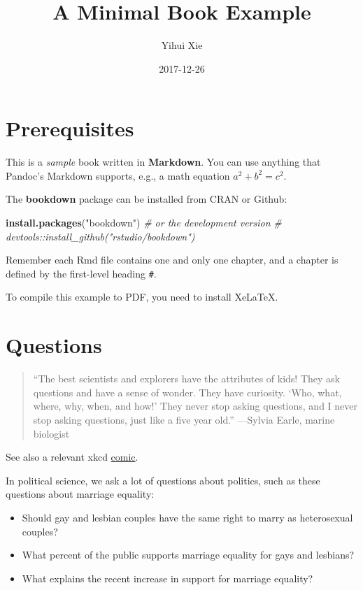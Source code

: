 \documentclass[]{book}
\title{A Minimal Book Example}
\author{Yihui Xie}
\date{2017-12-26}
\newenvironment{Shaded}{\begin{snugshade}}{\end{snugshade}}
\newcommand{\KeywordTok}[1]{\textcolor[rgb]{0.13,0.29,0.53}{\textbf{#1}}}
\newcommand{\StringTok}[1]{\textcolor[rgb]{0.31,0.60,0.02}{#1}}
\newcommand{\CommentTok}[1]{\textcolor[rgb]{0.56,0.35,0.01}{\textit{#1}}}
\newcommand{\NormalTok}[1]{#1}
\providecommand{\tightlist}{%
  \setlength{\itemsep}{0pt}\setlength{\parskip}{0pt}}
\theoremstyle{definition}
\theoremstyle{definition}
\theoremstyle{definition}
\theoremstyle{remark}
\begin{document}
\maketitle

{
\setcounter{tocdepth}{1}
\tableofcontents
}
\chapter{Prerequisites}\label{prerequisites}

This is a \emph{sample} book written in \textbf{Markdown}. You can use
anything that Pandoc's Markdown supports, e.g., a math equation
\(a^2 + b^2 = c^2\).

The \textbf{bookdown} package can be installed from CRAN or Github:

\begin{Shaded}
\begin{Highlighting}[]
\KeywordTok{install.packages}\NormalTok{(}\StringTok{"bookdown"}\NormalTok{)}
\CommentTok{# or the development version}
\CommentTok{# devtools::install_github("rstudio/bookdown")}
\end{Highlighting}
\end{Shaded}

Remember each Rmd file contains one and only one chapter, and a chapter
is defined by the first-level heading \texttt{\#}.

To compile this example to PDF, you need to install XeLaTeX.

\chapter{Questions}\label{questions}

\begin{quote}
``The best scientists and explorers have the attributes of kids! They
ask questions and have a sense of wonder. They have curiosity. `Who,
what, where, why, when, and how!' They never stop asking questions, and
I never stop asking questions, just like a five year old.'' ---Sylvia
Earle, marine biologist
\end{quote}

See also a relevant xkcd \href{https://xkcd.com/242/}{comic}.

In political science, we ask a lot of questions about politics, such as
these questions about marriage equality:

\begin{itemize}
\tightlist
\item
  Should gay and lesbian couples have the same right to marry as
  heterosexual couples?
\item
  What percent of the public supports marriage equality for gays and
  lesbians?
\item
  What explains the recent increase in support for marriage equality?
\end{itemize}
\end{document}
